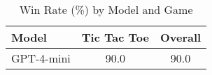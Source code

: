 \begin{table}[htbp]
\centering
\caption{Win Rate (\%) by Model and Game}
\begin{tabular}{lcc}
\toprule
Model & Tic Tac Toe & Overall \\
\midrule
GPT-4-mini & 90.0 & 90.0 \\
\bottomrule
\end{tabular}
\end{table}
